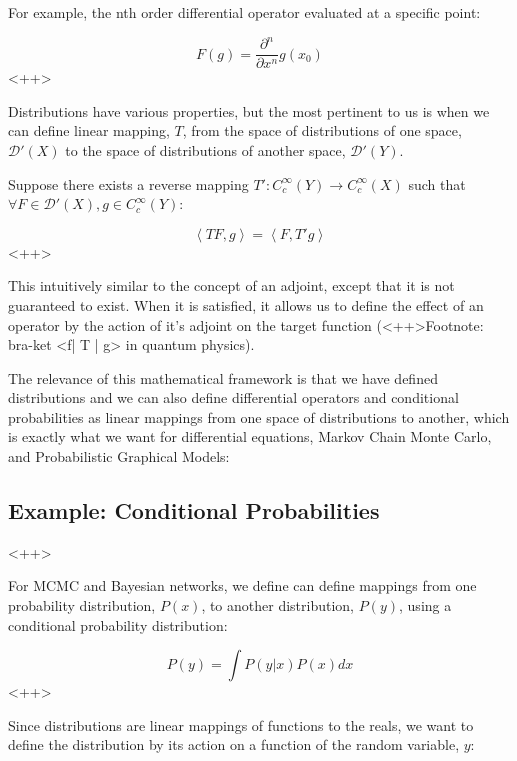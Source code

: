 \documentclass[a4paper]{article}
\begin{document}
For example, the nth order differential operator evaluated at a specific point:

\begin{equation}
  F(g) = \frac{\partial^n}{\partial x^n} g(x_0)
  \label{<++>}
\end{equation}<++>

Distributions have various properties, but the most pertinent to us is when we can define linear mapping, $T$, from the space of distributions of one space, $\mathcal{D}'(X)$ to the space of distributions of another space, $\mathcal{D}'(Y)$.

Suppose there exists a reverse mapping $T': C_c^{\infty}(Y) \rightarrow C_c^{\infty}(X)$ such that $\forall F \in \mathcal{D}'(X), g \in C_c^{\infty}(Y)$:

\begin{equation}
  \left< T F, g \right> = \left< F, T' g \right>
  \label{<++>}
\end{equation}<++>

This intuitively similar to the concept of an adjoint, except that it is not guaranteed to exist. 
When it is satisfied, it allows us to define the effect of an operator by the action of it's adjoint on the target function (<++>Footnote: bra-ket <f| T | g> in quantum physics).

The relevance of this mathematical framework is that we have defined distributions and we can also define differential operators and conditional probabilities as linear mappings from one space of distributions to another, which is exactly what we want for differential equations, Markov Chain Monte Carlo, and Probabilistic Graphical Models:

\subsection{Example: Conditional Probabilities}<++>

For MCMC and Bayesian networks, we define can define mappings from one probability distribution, $P(x)$, to another distribution, $P(y)$, using a conditional probability distribution:

\begin{equation}
  P(y) = \int P(y \vert x) P(x) dx
  \label{<++>}
\end{equation}<++>

Since distributions are linear mappings of functions to the reals, we want to define the distribution by its action on a function of the random variable, $y$:
\end{document}
